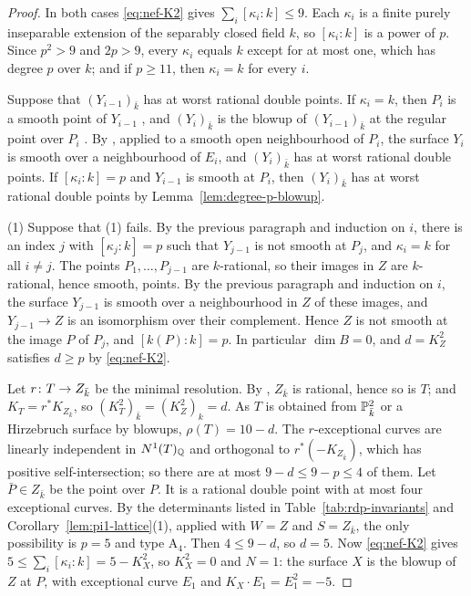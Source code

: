\begin{proof}
In both cases \eqref{eq:nef-K2} gives $\sum_i[\kappa_i:k]\leq 9$.
Each $\kappa_i$ is a finite purely inseparable extension of the separably closed field $k$, so $[\kappa_i:k]$ is a power of $p$.
Since $p^2>9$ and $2p>9$, every $\kappa_i$ equals $k$ except for at most one, which has degree $p$ over $k$; and if $p\geq 11$, then $\kappa_i = k$ for every $i$.

Suppose that $(Y_{i-1})_{\bar k}$ has at worst rational double points.
If $\kappa_i = k$, then $P_i$ is a smooth point of $Y_{i-1}$ \cite[Tags~ and~]{Stacks}, and $(Y_i)_{\bar k}$ is the blowup of $(Y_{i-1})_{\bar k}$ at the regular point over $P_i$ \cite[Tag~]{Stacks}.
By \cite[II, Theorem~8.24]{Har77}, applied to a smooth open neighbourhood of $P_i$, the surface $Y_i$ is smooth over a neighbourhood of $E_i$, and $(Y_i)_{\bar k}$ has at worst rational double points.
If $[\kappa_i:k] = p$ and $Y_{i-1}$ is smooth at $P_i$, then $(Y_i)_{\bar k}$ has at worst rational double points by Lemma~\ref{lem:degree-p-blowup}.

(1) Suppose that \textup{(1)} fails.
By the previous paragraph and induction on $i$, there is an index $j$ with $[\kappa_j:k] = p$ such that $Y_{j-1}$ is not smooth at $P_j$, and $\kappa_i = k$ for all $i\neq j$.
The points $P_1,\dots,P_{j-1}$ are $k$-rational, so their images in $Z$ are $k$-rational, hence smooth, points.
By the previous paragraph and induction on $i$, the surface $Y_{j-1}$ is smooth over a neighbourhood in $Z$ of these images, and $Y_{j-1}\to Z$ is an isomorphism over their complement.
Hence $Z$ is not smooth at the image $P$ of $P_j$, and $[k(P):k] = p$.
In particular $\dim B = 0$, and $d = K_Z^2$ satisfies $d\geq p$ by \eqref{eq:nef-K2}.

Let $r\colon T\to Z_{\bar k}$ be the minimal resolution.
By \cite[Lemma~3.2]{BT22}, $Z_{\bar k}$ is rational, hence so is $T$; and $K_T = r^*K_{Z_{\bar k}}$, so $(K_T^2)_{\bar k} = (K_Z^2)_k = d$.
As $T$ is obtained from $\mathbb{P}^2_{\bar k}$ or a Hirzebruch surface by blowups, $\rho(T) = 10-d$.
The $r$-exceptional curves are linearly independent in $N^1(T)_{\mathbb{Q}}$ and orthogonal to $r^*(-K_{Z_{\bar k}})$, which has positive self-intersection; so there are at most $9-d\leq 9-p\leq 4$ of them.
Let $\bar P\in Z_{\bar k}$ be the point over $P$.
It is a rational double point with at most four exceptional curves.
By the determinants listed in Table~\ref{tab:rdp-invariants} and Corollary~\ref{lem:pi1-lattice}(1), applied with $W = Z$ and $S = Z_{\bar k}$, the only possibility is $p = 5$ and type $\mathrm A_4$.
Then $4\leq 9-d$, so $d = 5$.
Now \eqref{eq:nef-K2} gives $5\leq\sum_i[\kappa_i:k] = 5-K_X^2$, so $K_X^2 = 0$ and $N = 1$: the surface $X$ is the blowup of $Z$ at $P$, with exceptional curve $E_1$ and $K_X\cdot E_1 = E_1^2 = -5$.


\end{proof}

